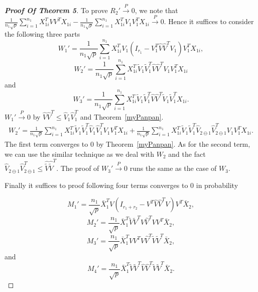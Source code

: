 \begin{proof}[\textbf{Proof Of Theorem 5}]
To prove $R_2'\xrightarrow{P}0$, we note that
 $\frac{1}{n_1\sqrt{p}}\sum_{i=1}^{n_1}X_{1i}^T VV^T X_{1i}-
\frac{1}{n_1\sqrt{p}}\sum_{i=1}^{n_1}X_{1i}^T V_1V_1^T X_{1i}\xrightarrow{P}0$.
    Hence it suffices to consider the following three parts
    \begin{equation*}
        W_1'=\frac{1}{n_1\sqrt{p}}\sum_{i=1}^{n_1}X_{1i}^T V_1(I_{r_1}-V_1^T\hat{V}\hat{V}^T V_1)V_1^T X_{1i},
    \end{equation*}
    \begin{equation*}
        W_2'=\frac{1}{n_1\sqrt{p}}\sum_{i=1}^{n_1}X_{1i}^T \tilde{V}_1\tilde{V}_1^T\hat{V}\hat{V}^T V_1V_1^T X_{1i}
    \end{equation*}
    and
    \begin{equation*}
        W_3'=\frac{1}{n_1\sqrt{p}}\sum_{i=1}^{n_1}X_{1i}^T \tilde{V}_1\tilde{V}_1^T\hat{V}\hat{V}^T \tilde{V}_1\tilde{V}_1^T X_{1i}.
    \end{equation*}
$W_1'\xrightarrow{P}0$ by $\hat{V}\hat{V}^T\leq \hat{V}_1\hat{V}_1^T$ and Theorem~\ref{myPanpan}.
\begin{equation*}
\begin{aligned}
        W_2'=\frac{1}{n_1\sqrt{p}}\sum_{i=1}^{n_1}X_{1i}^T \tilde{V}_1\tilde{V}_1^T\hat{V}_1\hat{V}_1^T V_1V_1^T X_{1i}+\frac{1}{n_1\sqrt{p}}\sum_{i=1}^{n_1}X_{1i}^T \tilde{V}_1\tilde{V}_1^T\hat{V}_{2\ominus 1}\hat{V}_{2\ominus 1}^T V_1V_1^T X_{1i}.
\end{aligned}
\end{equation*}
The first term converges to $0$ by Theorem~\ref{myPanpan}. As for the second term, we can use the similar technique as we deal with $W_2$ and the fact $\hat{V}_{2\ominus 1}\hat{V}_{2\ominus 1}^T\leq \hat{\tilde{V}}\hat{\tilde{V}}^T$.
The proof of $W_3'\xrightarrow{P}0$ runs the same as the case of $W_3$.

Finally it suffices to proof following four terms converges to $0$ in probability

    \begin{equation*}
        M_1'=\frac{n_1}{\sqrt{p}}\bar{X}_1^T V(I_{r_1+r_2}-V^T\hat{V}\hat{V}^T V)V^T \bar{X}_2,
    \end{equation*}
    \begin{equation*}
        M_2'=\frac{n_1}{\sqrt{p}}\bar{X}_1^T \tilde{V}\tilde{V}^T\hat{V}\hat{V}^T VV^T \bar{X}_2,
    \end{equation*}
    \begin{equation*}
        M_3'=\frac{n_1}{\sqrt{p}}\bar{X}_1^T {V}{V}^T\hat{V}\hat{V}^T \tilde{V}\tilde{V}^T \bar{X}_2,
    \end{equation*}
    and
    \begin{equation*}
        M_4'=\frac{n_1}{\sqrt{p}}\bar{X}_1^T \tilde{V}\tilde{V}^T\hat{V}\hat{V}^T \tilde{V}\tilde{V}^T \bar{X}_2.
    \end{equation*}


\end{proof}
